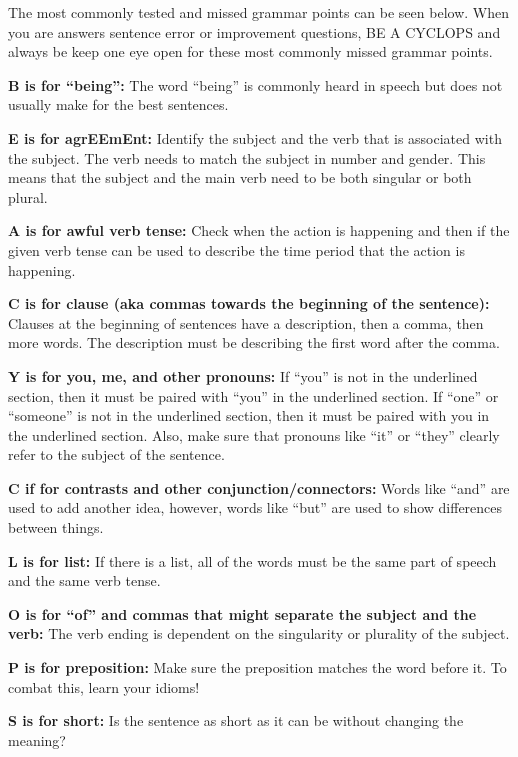 \documentclass[12pt]{book}
\begin{document}
\bigskip

The most commonly tested and missed grammar points can be seen below. When you are answers sentence error or improvement questions, BE A CYCLOPS and always be keep one eye open for these most commonly missed grammar points.

\bigskip
\textbf{B is for “being”:} The word “being” is commonly heard in speech but does not usually make for the best sentences.

\bigskip
\textbf{E is for agrEEmEnt:} Identify the subject and the verb that is associated with the subject. The verb needs to match the subject in number and gender. This means that the subject and the main verb need to be both singular or both plural. 

\bigskip

\bigskip
\textbf{A is for awful verb tense:} Check when the action is happening and then if the given verb tense can be used to describe the time period that the action is happening. 

\bigskip

\bigskip
\textbf{C is for clause (aka commas towards the beginning of the sentence):} Clauses at the beginning of sentences have a description, then a comma, then more words. The description must be describing the first word after the comma. 

\bigskip
\textbf{Y is for you, me, and other pronouns:} If “you” is not in the underlined section, then it must be paired with “you” in the underlined section. If “one” or “someone” is not in the underlined section, then it must be paired with you in the underlined section. Also, make sure that pronouns like “it” or “they” clearly refer to the subject of the sentence. 

\bigskip
\textbf{C if for contrasts and other conjunction/connectors:} Words like “and” are used to add another idea, however, words like “but” are used to show differences between things. 

\bigskip
\textbf{L is for list:} If there is a list, all of the words must be the same part of speech and the same verb tense. 

\bigskip
\textbf{O is for “of” and commas that might separate the subject and the verb:} The verb ending is dependent on the singularity or plurality of the subject.

\bigskip
\textbf{P is for preposition:} Make sure the preposition matches the word before it. To combat this, learn your idioms!

\bigskip
\textbf{S is for short:} Is the sentence as short as it can be without changing the meaning? 
\end{document}
